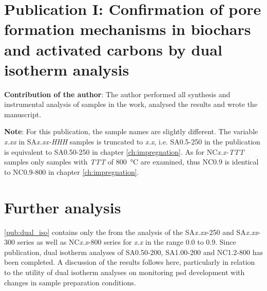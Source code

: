 \section[Publication I]{Publication I: Confirmation of pore formation mechanisms in biochars and activated carbons by dual isotherm analysis}

\textbf{Contribution of the author}: The author performed all synthesis and instrumental analysis of samples in the work, analysed the results and wrote the manuscript.

\textbf{Note}: For this publication, the sample names are slightly different. The variable \textit{x.xx} in SA\textit{x.xx-HHH} samples is truncated to \textit{x.x}, i.e. SA0.5-250 in the publication is equivalent to SA0.50-250 in chapter \ref{ch:impregnation}. As for NC\textit{x.x-TTT} samples only samples with \textit{TTT} of \qty{800}{\degreeCelsius} are examined, thus NC0.9 is identical to NC0.9-800 in chapter \ref{ch:impregnation}.  

\setcounter{opagenum}{\thepage}
\newpage

\setlength{\originalVOffset}{\voffset}   
\setlength{\originalHOffset}{\hoffset}

\setlength{\voffset}{0cm}
\setlength{\hoffset}{0cm}

\setlength{\voffset}{\originalVOffset}
\setlength{\hoffset}{\originalHOffset}

\newpage
\section{Further analysis}
\ref{pub:dual_iso} contains only the  from the analysis of the SA\textit{x.xx}-250 and SA\textit{x.xx}-300 series as well as NC\textit{x.x}-800 series for \textit{x.x} in the range 0.0 to 0.9. Since publication, dual isotherm analyses of SA0.50-200, SA1.00-200 and NC1.2-800 has been completed. A discussion of the results follows here, particularly in relation to the utility of dual isotherm analyses on monitoring \acrshort{psd} development with changes in sample preparation conditions.

